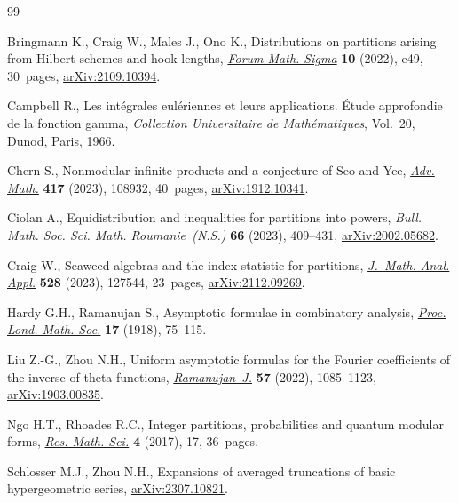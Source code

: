 \documentclass[10pt,a4paper]{amsart}
\numberwithin{equation}{section}
\begin{document}
\begin{thebibliography}{99}
\footnotesize\itemsep=0pt

Bringmann K., Craig W., Males J., Ono K., Distributions on partitions arising
 from {H}ilbert schemes and hook lengths, \href{https://doi.org/10.1017/fms.2022.45}{\textit{Forum Math. Sigma}}
 \textbf{10} (2022), e49, 30~pages, \href{https://arxiv.org/abs/2109.10394}{arXiv:2109.10394}.

Campbell R., Les int\'egrales eul\'eriennes et leurs applications. \'{E}tude
 approfondie de la fonction gamma, \textit{Collection Universitaire de
 Math\'ematiques}, Vol.~20, Dunod, Paris, 1966.

Chern S., Nonmodular infinite products and a conjecture of {S}eo and {Y}ee,
 \href{https://doi.org/10.1016/j.aim.2023.108932}{\textit{Adv. Math.}} \textbf{417} (2023), 108932, 40~pages,
 \href{https://arxiv.org/abs/1912.10341}{arXiv:1912.10341}.

Ciolan A., Equidistribution and inequalities for partitions into powers,
 \textit{Bull. Math. Soc. Sci. Math. Roumanie~(N.S.)} \textbf{66} (2023),
 409--431, \href{https://arxiv.org/abs/2002.05682}{arXiv:2002.05682}.

Craig W., Seaweed algebras and the index statistic for partitions,
 \href{https://doi.org/10.1016/j.jmaa.2023.127544}{\textit{J.~Math. Anal. Appl.}} \textbf{528} (2023), 127544, 23~pages,
 \href{https://arxiv.org/abs/2112.09269}{arXiv:2112.09269}.

Hardy G.H., Ramanujan S., Asymptotic formulae in combinatory analysis,
 \href{https://doi.org/10.1112/plms/s2-17.1.75}{\textit{Proc. Lond. Math. Soc.}} \textbf{17} (1918), 75--115.

Liu Z.-G., Zhou N.H., Uniform asymptotic formulas for the {F}ourier coefficients
 of the inverse of theta functions, \href{https://doi.org/10.1007/s11139-021-00409-8}{\textit{Ramanujan~J.}} \textbf{57} (2022),
 1085--1123, \href{https://arxiv.org/abs/1903.00835}{arXiv:1903.00835}.

Ngo H.T., Rhoades R.C., Integer partitions, probabilities and quantum modular
 forms, \href{https://doi.org/10.1186/s40687-017-0102-4}{\textit{Res. Math. Sci.}} \textbf{4} (2017), 17, 36~pages.

Schlosser M.J., Zhou N.H., Expansions of averaged truncations of basic
 hypergeometric series, \href{https://arxiv.org/abs/2307.10821}{arXiv:2307.10821}.


\end{thebibliography}
\end{document}
